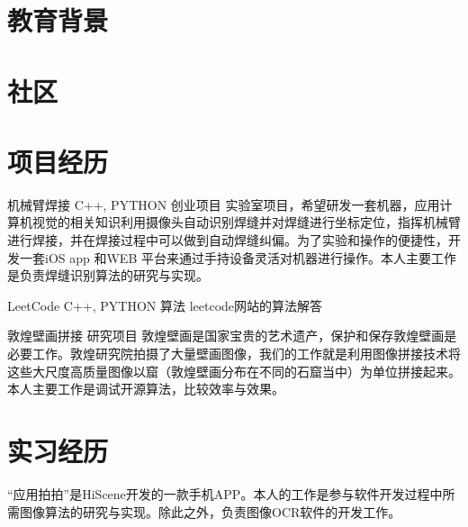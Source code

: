 \documentclass[11pt,a4paper]{moderncv}
\title{}               %
\begin{document}
\maketitle

\section{教育背景}
 {}{} %


\section{社区}

\section{项目经历}
\renewcommand{\baselinestretch}{0.8}

{机械臂焊接}
{C++, PYTHON}
{创业项目}{}
{实验室项目，希望研发一套机器，应用计算机视觉的相关知识利用摄像头自动识别焊缝并对焊缝进行坐标定位，指挥机械臂进行焊接，并在焊接过程中可以做到自动焊缝纠偏。为了实验和操作的便捷性，开发一套iOS app 和WEB 平台来通过手持设备灵活对机器进行操作。本人主要工作是负责焊缝识别算法的研究与实现。}

\vspace*{0.2\baselineskip}
{LeetCode}
{C++, PYTHON}
{算法}{}
{leetcode网站的算法解答}

\vspace*{0.2\baselineskip}
{敦煌壁画拼接}{}
{研究项目}{}
{敦煌壁画是国家宝贵的艺术遗产，保护和保存敦煌壁画是必要工作。敦煌研究院拍摄了大量壁画图像，我们的工作就是利用图像拼接技术将这些大尺度高质量图像以窟（敦煌壁画分布在不同的石窟当中）为单位拼接起来。本人主要工作是调试开源算法，比较效率与效果。}

\section{实习经历}
{“应用拍拍”是HiScene开发的一款手机APP。本人的工作是参与软件开发过程中所需图像算法的研究与实现。除此之外，负责图像OCR软件的开发工作。}
\end{document}

